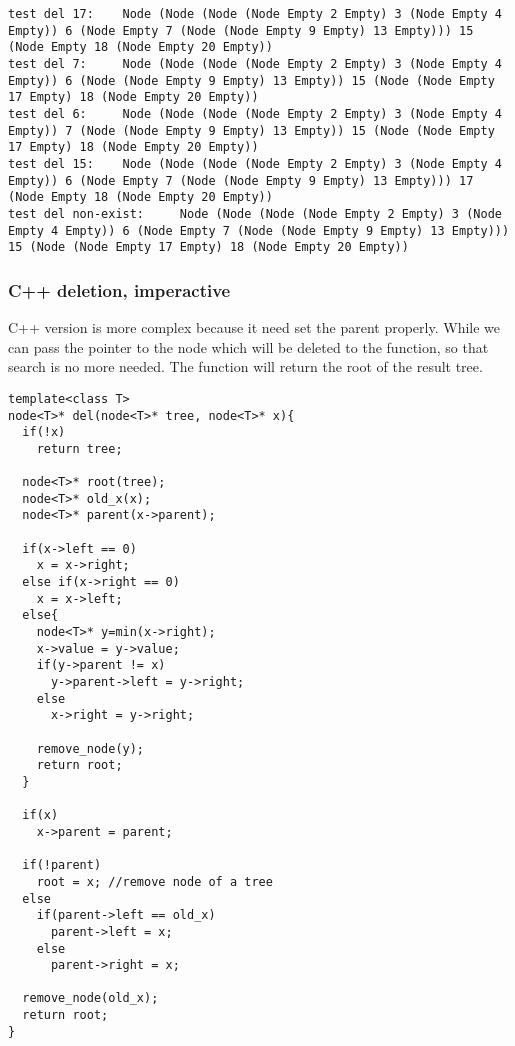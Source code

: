 \documentclass{article}
\begin{document}
\begin{verbatim}
test del 17:    Node (Node (Node (Node Empty 2 Empty) 3 (Node Empty 4 
Empty)) 6 (Node Empty 7 (Node (Node Empty 9 Empty) 13 Empty))) 15 
(Node Empty 18 (Node Empty 20 Empty))
test del 7:     Node (Node (Node (Node Empty 2 Empty) 3 (Node Empty 4 
Empty)) 6 (Node (Node Empty 9 Empty) 13 Empty)) 15 (Node (Node Empty 
17 Empty) 18 (Node Empty 20 Empty))
test del 6:     Node (Node (Node (Node Empty 2 Empty) 3 (Node Empty 4 
Empty)) 7 (Node (Node Empty 9 Empty) 13 Empty)) 15 (Node (Node Empty 
17 Empty) 18 (Node Empty 20 Empty))
test del 15:    Node (Node (Node (Node Empty 2 Empty) 3 (Node Empty 4 
Empty)) 6 (Node Empty 7 (Node (Node Empty 9 Empty) 13 Empty))) 17 
(Node Empty 18 (Node Empty 20 Empty))
test del non-exist:     Node (Node (Node (Node Empty 2 Empty) 3 (Node 
Empty 4 Empty)) 6 (Node Empty 7 (Node (Node Empty 9 Empty) 13 Empty))) 
15 (Node (Node Empty 17 Empty) 18 (Node Empty 20 Empty))
\end{verbatim}

\subsubsection*{C++ deletion, imperactive}

C++ version is more complex because it need set the parent properly.
While we can pass the pointer to the node which will be deleted to the function,
so that search is no more needed. The function will return the root
of the result tree.

\lstset{language=C++}
\begin{lstlisting}
template<class T>
node<T>* del(node<T>* tree, node<T>* x){
  if(!x)
    return tree;

  node<T>* root(tree);
  node<T>* old_x(x);
  node<T>* parent(x->parent);

  if(x->left == 0)
    x = x->right;
  else if(x->right == 0)
    x = x->left;
  else{
    node<T>* y=min(x->right);
    x->value = y->value;
    if(y->parent != x)
      y->parent->left = y->right;
    else
      x->right = y->right;

    remove_node(y);
    return root;
  }

  if(x)
    x->parent = parent;

  if(!parent)
    root = x; //remove node of a tree
  else
    if(parent->left == old_x)
      parent->left = x;
    else
      parent->right = x;

  remove_node(old_x);
  return root;
}
\end{lstlisting}
\end{document}
